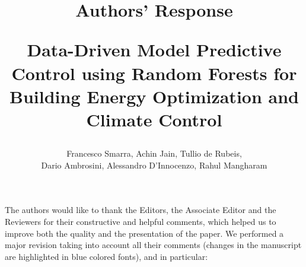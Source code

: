 \documentclass{article}
\begin{document}
\title{Authors' Response \\
\begin{Large}
	Data-Driven Model Predictive Control using Random Forests for Building Energy Optimization and Climate Control
\end{Large}
}



\author{Francesco Smarra, Achin Jain, Tullio de Rubeis, \\ Dario Ambrosini, Alessandro D’Innocenzo, Rahul Mangharam}



\date{}

\maketitle
\bigskip



The authors would like to thank the Editors, the Associate Editor and the Reviewers for their constructive and helpful comments, which helped us to improve both the quality and the presentation of the paper. We performed a major revision taking into account all their comments (changes in the manuscript are highlighted in \textcolor[rgb]{0.00,0.00,1.00}{blue colored fonts}), and in particular:
\end{document}
